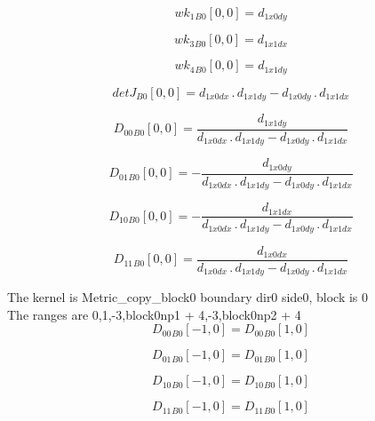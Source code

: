 \documentclass{article}
\begin{document}
\begin{dmath}{wk_{1}{_{B0}}}[{0,0}] = d_{1 x0 dy}\end{dmath}

\begin{dmath}{wk_{3}{_{B0}}}[{0,0}] = d_{1 x1 dx}\end{dmath}

\begin{dmath}{wk_{4}{_{B0}}}[{0,0}] = d_{1 x1 dy}\end{dmath}

\begin{dmath}{detJ{_{B0}}}[{0,0}] = d_{1 x0 dx} \,.\, d_{1 x1 dy} - d_{1 x0 dy} \,.\, d_{1 x1 dx}\end{dmath}

\begin{dmath}{D_{00}{_{B0}}}[{0,0}] = \frac{d_{1 x1 dy}}{d_{1 x0 dx} \,.\, d_{1 x1 dy} - d_{1 x0 dy} \,.\, d_{1 x1 dx}}\end{dmath}

\begin{dmath}{D_{01}{_{B0}}}[{0,0}] = - \frac{d_{1 x0 dy}}{d_{1 x0 dx} \,.\, d_{1 x1 dy} - d_{1 x0 dy} \,.\, d_{1 x1 dx}}\end{dmath}

\begin{dmath}{D_{10}{_{B0}}}[{0,0}] = - \frac{d_{1 x1 dx}}{d_{1 x0 dx} \,.\, d_{1 x1 dy} - d_{1 x0 dy} \,.\, d_{1 x1 dx}}\end{dmath}

\begin{dmath}{D_{11}{_{B0}}}[{0,0}] = \frac{d_{1 x0 dx}}{d_{1 x0 dx} \,.\, d_{1 x1 dy} - d_{1 x0 dy} \,.\, d_{1 x1 dx}}\end{dmath}

\noindent The kernel is Metric_copy_block0 boundary dir0 side0, block is 0\\\noindent The ranges are 0,1,-3,block0np1 + 4,-3,block0np2 + 4\\\begin{dmath}{D_{00}{_{B0}}}[{-1,0}] = {D_{00}{_{B0}}}[{1,0}]\end{dmath}

\begin{dmath}{D_{01}{_{B0}}}[{-1,0}] = {D_{01}{_{B0}}}[{1,0}]\end{dmath}

\begin{dmath}{D_{10}{_{B0}}}[{-1,0}] = {D_{10}{_{B0}}}[{1,0}]\end{dmath}

\begin{dmath}{D_{11}{_{B0}}}[{-1,0}] = {D_{11}{_{B0}}}[{1,0}]\end{dmath}
\end{document}
